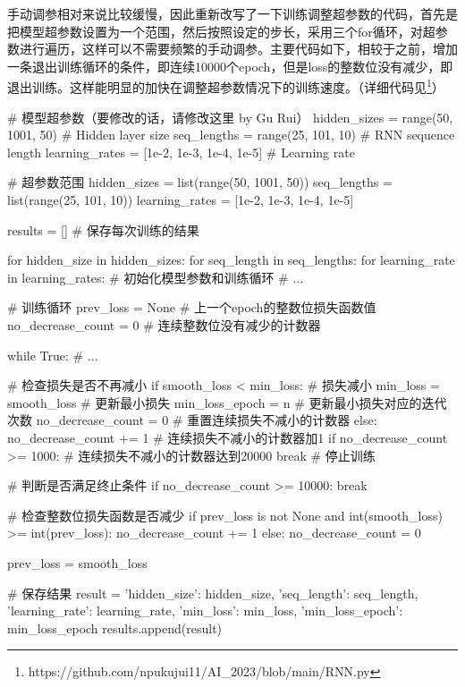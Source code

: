 \documentclass[letterpaper,12pt]{article}
\begin{document}
			手动调参相对来说比较缓慢，因此重新改写了一下训练调整超参数的代码，首先是把模型超参数设置为一个范围，然后按照设定的步长，采用三个for循环，对超参数进行遍历，这样可以不需要频繁的手动调参。主要代码如下，相较于之前，增加一条退出训练循环的条件，即连续10000个epoch，但是loss的整数位没有减少，即退出训练。这样能明显的加快在调整超参数情况下的训练速度。（详细代码见\footnote{https://github.com/npukujui11/AI\_2023/blob/main/RNN.py}）
			\begin{python}
				# 模型超参数（要修改的话，请修改这里 by Gu Rui）
				hidden_sizes = range(50, 1001, 50)  # Hidden layer size
				seq_lengths = range(25, 101, 10)  # RNN sequence length
				learning_rates = [1e-2, 1e-3, 1e-4, 1e-5]  # Learning rate
				
				# 超参数范围
				hidden_sizes = list(range(50, 1001, 50))
				seq_lengths = list(range(25, 101, 10))
				learning_rates = [1e-2, 1e-3, 1e-4, 1e-5]
				
				results = []  # 保存每次训练的结果
				
				for hidden_size in hidden_sizes:
					for seq_length in seq_lengths:
						for learning_rate in learning_rates:
							# 初始化模型参数和训练循环
							# ...
				
							# 训练循环
							prev_loss = None  # 上一个epoch的整数位损失函数值
							no_decrease_count = 0  # 连续整数位没有减少的计数器
				
							while True:
								# ...
					
								# 检查损失是否不再减小
								if smooth_loss < min_loss:  # 损失减小
								min_loss = smooth_loss  # 更新最小损失
								min_loss_epoch = n  # 更新最小损失对应的迭代次数
								no_decrease_count = 0  # 重置连续损失不减小的计数器
								else:
								no_decrease_count += 1  # 连续损失不减小的计数器加1
								if no_decrease_count >= 1000:  # 连续损失不减小的计数器达到20000
								break  # 停止训练
					
								# 判断是否满足终止条件
								if no_decrease_count >= 10000:
								break
					
								# 检查整数位损失函数是否减少
								if prev_loss is not None and int(smooth_loss) >= int(prev_loss):
								no_decrease_count += 1
								else:
								no_decrease_count = 0
					
								prev_loss = smooth_loss
				
							# 保存结果
							result = {
								'hidden_size': hidden_size,
								'seq_length': seq_length,
								'learning_rate': learning_rate,
								'min_loss': min_loss,
								'min_loss_epoch': min_loss_epoch
							}
							results.append(result)
			\end{python}
			
\end{document}
